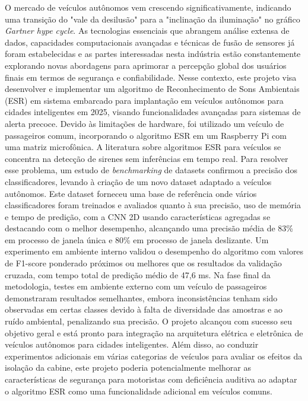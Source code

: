 \begin{resumo}

O mercado de veículos autônomos vem crescendo significativamente, indicando uma transição do "vale da desilusão" para a "inclinação da iluminação" no gráfico \textit{Gartner hype cycle}. As tecnologias essenciais que abrangem análise extensa de dados, capacidades computacionais avançadas e técnicas de fusão de sensores já foram estabelecidas e as partes interessadas nesta indústria estão constantemente explorando novas abordagens para aprimorar a percepção global dos usuários finais em termos de segurança e confiabilidade. Nesse contexto, este projeto visa desenvolver e implementar um algoritmo de Reconhecimento de Sons Ambientais (ESR) em sistema embarcado para implantação em veículos autônomos para cidades inteligentes em 2025, visando funcionalidades avançadas para sistemas de alerta precoce. Devido às limitações de hardware, foi utilizado um veículo de passageiros comum, incorporando o algoritmo ESR em um Raspberry Pi com uma matriz microfônica. A literatura sobre algoritmos ESR para veículos se concentra na detecção de sirenes sem inferências em tempo real. Para resolver esse problema, um estudo de \textit{benchmarking} de datasets confirmou a precisão dos classificadores, levando à criação de um novo dataset adaptado a veículos autônomos. Este dataset forneceu uma base de referência onde vários classificadores foram treinados e avaliados quanto à sua precisão, uso de memória e tempo de predição, com a CNN 2D usando características agregadas se destacando com o melhor desempenho, alcançando uma precisão média de 83\% em processo de janela única e 80\% em processo de janela deslizante. Um experimento em ambiente interno validou o desempenho do algoritmo com valores de F1-score ponderado próximos ou melhores que os resultados da validação cruzada, com tempo total de predição médio de 47,6 ms. Na fase final da metodologia, testes em ambiente externo com um veículo de passageiros demonstraram resultados semelhantes, embora inconsistências tenham sido observadas em certas classes devido à falta de diversidade das amostras e ao ruído ambiental, penalizando sua precisão. O projeto alcançou com sucesso seu objetivo geral e está pronto para integração na arquitetura elétrica e eletrônica de veículos autônomos para cidades inteligentes. Além disso, ao conduzir experimentos adicionais em várias categorias de veículos para avaliar os efeitos da isolação da cabine, este projeto poderia potencialmente melhorar as características de segurança para motoristas com deficiência auditiva ao adaptar o algoritmo ESR como uma funcionalidade adicional em veículos comuns.

\end{resumo}